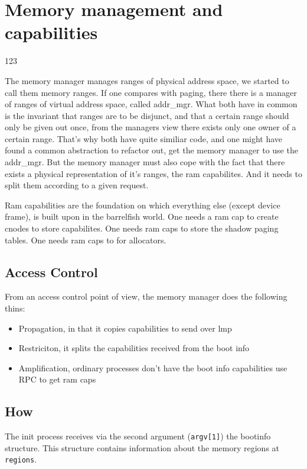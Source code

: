 \chapter{Memory management and capabilities}

123 \cite{aos-book}

The memory manager manages ranges of physical address space, we started to call
them memory ranges.
If one compares with paging, there there is a manager of ranges of virtual
address space, called addr\_mgr.
What both have in common is the invariant that ranges are to be disjunct, and
that a certain range should only be given out once, from the managers view there
exists only one owner of a certain range.
That's why both have quite similiar code, and one might have found a common
abstraction to refactor out, get the memory manager to use the addr\_mgr.
But the memory manager must also cope with the fact that there exists a physical
representation of it's ranges, the ram capabilites. And it needs to split them
according to a given request.

Ram capabilities are the foundation on which everything else (except device
frame), is built upon in the barrelfish world.
One needs a ram cap to create cnodes to store capabilites.
One needs ram caps to store the shadow paging tables.
One needs ram caps to for allocators.

\section{Access Control}

From an access control point of view, the memory manager does the following thins:
\begin{itemize}
	\item Propagation, in that it copies capabilities to send over lmp
	\item Restriciton, it splits the capabilities received from the boot info
	\item Amplification, ordinary processes don't have the boot info capabilities
		 		use RPC to get ram caps
\end{itemize}

\section{How}

The init process receives via the second argument (\verb|argv[1]|) the bootinfo
structure.
This structure contains information about the memory regions at \verb|regions|.

